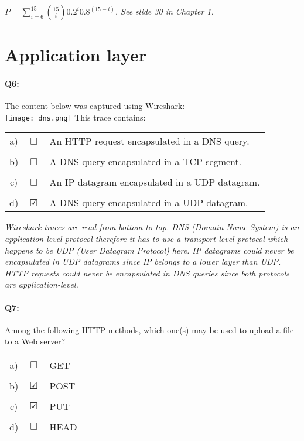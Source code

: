 \documentclass{llncs}
\newcommand{\answer}[1]{{\color{red}\textit{#1}\color{black}}}
\begin{document}
\answer{
  $P=\sum_{i=6}^{15}{\binom {15}i 0.2^{i}0.8^{(15-i)}}$. See slide 30 in Chapter 1.
}

\section*{Application layer}

\paragraph{\textbf{Q6:}}
The content below was captured using
Wireshark:\\
\texttt{[image: dns.png]}
This trace contains:\\

\begin{tabular}{ccl}
  a) & $\Box$ & An HTTP request encapsulated in a DNS query.\\
  \\
  b) & $\Box$ & A DNS query encapsulated in a TCP segment.\\
  \\
  c) & $\Box$ & An IP datagram encapsulated in a UDP datagram.\\
  \\
  d) & $\CheckedBox$ & A DNS query encapsulated in a UDP datagram.
\end{tabular}

\answer{Wireshark traces are read from bottom to top. DNS (Domain Name
  System) is an application-level protocol therefore it has to use a
  transport-level protocol which happens to be UDP (User Datagram
  Protocol) here. IP datagrams could never be encapsulated in UDP datagrams
  since IP belongs to a lower layer than UDP. HTTP requests could
  never be encapsulated in DNS queries since both protocols are
  application-level.}

\paragraph{\textbf{Q7:}} Among the following HTTP methods, which one(s) may be used to upload a file to a
Web server?\\

\begin{tabular}{ccl}
  a) & $\Box$ & GET\\
  \\
  b) & $\CheckedBox$ & POST\\
  \\
  c) & $\CheckedBox$ & PUT\\
  \\
  d) & $\Box$ & HEAD\\
\end{tabular}
\end{document}
